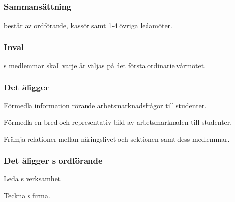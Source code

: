 \subsection{\ARMITFULL{}}
\subsubsection{Sammansättning}
\ARMIT{} består av ordförande, kassör samt 1-4 övriga ledamöter.

\subsubsection{Inval}
\ARMIT{}s medlemmar skall varje år väljas på det första ordinarie vårmötet.

\subsubsection{Det åligger \ARMIT{}}
\begin{att}
	\item Förmedla information rörande arbetsmarknadsfrågor till studenter.
	\item Förmedla en bred och representativ bild av arbetsmarknaden till studenter.
	\item Främja relationer mellan näringslivet och sektionen samt dess medlemmar.
\end{att}

\subsubsection{Det åligger \ARMIT{}s ordförande}
\begin{att}
	\item Leda \ARMIT{}s verksamhet.
	\item Teckna \ARMIT{}s firma.
\end{att}

